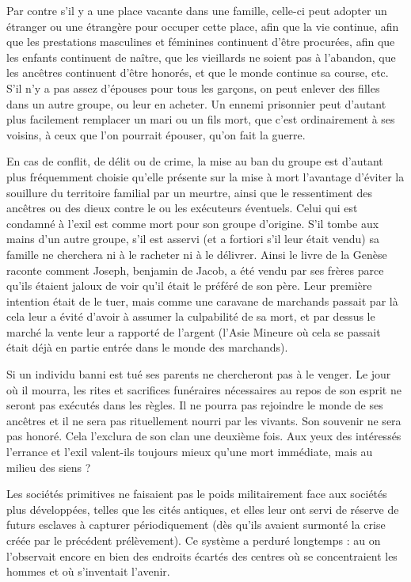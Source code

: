 Par contre s'il y a une place vacante dans une famille, celle-ci peut 
adopter un étranger ou une étrangère pour occuper cette place, afin que 
la vie continue, afin que les prestations masculines et féminines
continuent d'être procurées, afin que les enfants continuent de naître, que les 
vieillards ne soient pas à l'abandon, que les ancêtres continuent d'être 
honorés, et que le monde continue sa course, etc. S'il n'y a pas assez 
d'épouses pour tous les garçons, on peut enlever des filles dans un autre 
groupe, ou leur en acheter. Un ennemi prisonnier peut d'autant plus 
facilement remplacer un mari ou un fils mort, que c'est ordinairement à ses 
voisins, à ceux que l'on pourrait épouser, qu'on fait la guerre.

En cas de conflit, de délit ou de crime, la mise au ban du groupe 
est d'autant plus fréquemment choisie qu'elle présente sur la mise à mort 
l'avantage d'éviter la souillure du territoire familial par un meurtre, ainsi 
que le ressentiment des ancêtres ou des dieux contre le ou les exécuteurs 
éventuels. Celui qui est condamné à l'exil est comme mort pour son 
groupe d'origine. S'il tombe aux mains d'un autre groupe, s'il est asservi 
(et a fortiori s'il leur était vendu) sa famille ne cherchera ni à le racheter 
ni à le délivrer. Ainsi le livre de la Genèse raconte comment Joseph,
benjamin de Jacob, a été vendu par ses frères parce qu'ils étaient jaloux de 
voir qu'il était le préféré de son père. Leur première intention était de le 
tuer, mais comme une caravane de marchands passait par là cela leur a 
évité d'avoir à assumer la culpabilité de sa mort, et par dessus le marché 
la vente leur a rapporté de l'argent (l'Asie Mineure où cela se passait était 
déjà en partie entrée dans le monde des marchands).

Si un individu banni est tué ses parents ne chercheront pas à le 
venger. Le jour où il mourra, les rites et sacrifices funéraires nécessaires 
au repos de son esprit ne seront pas exécutés dans les règles. Il ne pourra 
pas rejoindre le monde de ses ancêtres et il ne sera pas rituellement
nourri par les vivants. Son souvenir ne sera pas honoré. Cela l'exclura de son 
clan une deuxième fois. Aux yeux des intéressés l'errance et l'exil
valent-ils toujours mieux qu'une mort immédiate, mais au milieu des siens ?

Les sociétés primitives ne faisaient pas le poids militairement face 
aux sociétés plus développées, telles que les cités antiques, et elles leur 
ont servi de réserve de futurs esclaves à capturer périodiquement (dès 
qu'ils avaient surmonté la crise créée par le précédent prélèvement). Ce 
système a perduré longtemps : au  on l'observait encore
en bien des endroits écartés des centres où se concentraient les hommes 
et où s'inventait l'avenir.



